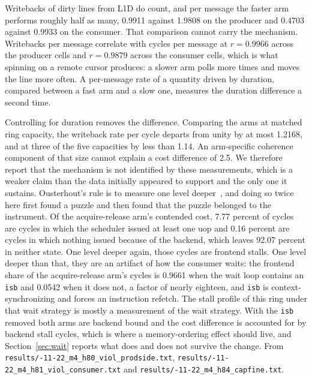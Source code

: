 \documentclass[conference]{IEEEtran}
\begin{document}
Writebacks of dirty lines from L1D do count, and per message the faster arm
performs roughly half as many, 0.9911 against 1.9808 on the producer and 0.4703
against 0.9933 on the consumer. That comparison cannot carry the mechanism.
Writebacks per message correlate with cycles per message at $r = 0.9966$ across
the producer cells and $r = 0.9879$ across the consumer cells, which is what
spinning on a remote cursor produces: a slower arm polls more times and moves
the line more often. A per-message rate of a quantity driven by duration,
compared between a fast arm and a slow one, measures the duration difference a
second time.

Controlling for duration removes the difference. Comparing the arms at matched
ring capacity, the writeback rate per cycle departs from unity by at most
1.2168, and at three of the five capacities by less than 1.14. An arm-specific
coherence component of that size cannot explain a cost difference of 2.5. We
therefore report that the mechanism is not identified by these measurements,
which is a weaker claim than the data initially appeared to support and the
only one it sustains. Ousterhout's rule is to measure one level
deeper~\cite{ousterhout2018deeper}, and doing so twice here first found a puzzle
and then found that the puzzle belonged to the instrument. Of the
acquire-release arm's contended cost, 7.77 percent of cycles are cycles in which
the scheduler issued at least one uop and 0.16 percent are cycles in which
nothing issued because of the backend, which leaves 92.07 percent in neither
state. One level deeper again, those cycles are frontend stalls. One level
deeper than that, they are an artifact of how the consumer waits: the frontend
share of the acquire-release arm's cycles is 0.9661 when the wait loop contains
an \texttt{isb} and 0.0542 when it does not, a factor of nearly eighteen, and
\texttt{isb} is context-synchronizing and forces an instruction refetch. The
stall profile of this ring under that wait strategy is mostly a measurement of
the wait strategy. With the \texttt{isb} removed both arms are backend bound and
the cost difference is accounted for by backend stall cycles, which is where a
memory-ordering effect should live, and Section~\ref{sec:wait} reports what does
and does not survive the change. From
\texttt{results/-11-22\_\allowbreak m4\_\allowbreak h80\_\allowbreak viol\_\allowbreak prodside.txt},
\texttt{results/-11-22\_\allowbreak m4\_\allowbreak h81\_\allowbreak viol\_\allowbreak consumer.txt} and
\texttt{results/-11-22\_\allowbreak m4\_\allowbreak h84\_\allowbreak capfine.txt}.
\end{document}
